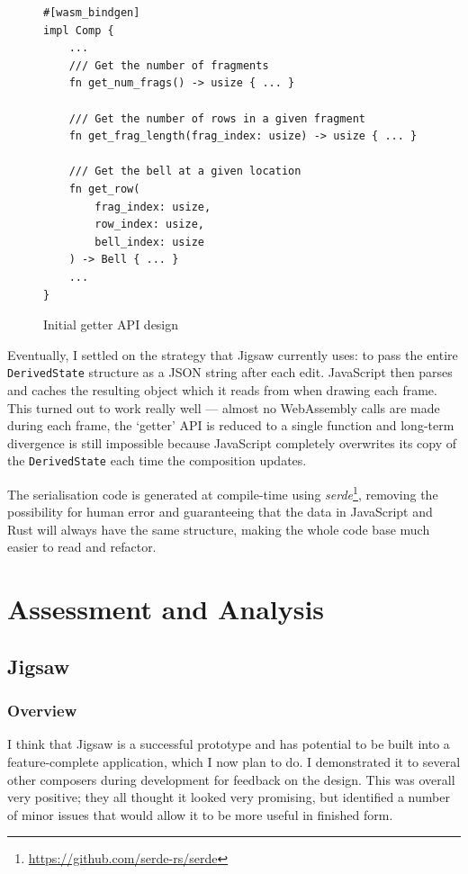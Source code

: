 \documentclass[12pt]{article}
\newcommand{\footurl}[1]{\footnote{\url{#1}}}
\begin{document}
\begin{figure}
    \begin{verbatim}
#[wasm_bindgen]
impl Comp {
    ...
    /// Get the number of fragments
    fn get_num_frags() -> usize { ... }

    /// Get the number of rows in a given fragment
    fn get_frag_length(frag_index: usize) -> usize { ... }

    /// Get the bell at a given location
    fn get_row(
        frag_index: usize,
        row_index: usize,
        bell_index: usize
    ) -> Bell { ... }
    ...
}
    \end{verbatim}
    \caption{Initial getter API design}\label{fig:initial-api}
\end{figure}

Eventually, I settled on the strategy that Jigsaw currently uses:  to pass the entire
\verb|DerivedState| structure as a JSON string after each edit.  JavaScript then parses and caches
the resulting object which it reads from when drawing each frame.  This turned out to work really
well --- almost no WebAssembly calls are made during each frame, the `getter' API is reduced to a
single function and long-term divergence is still impossible because JavaScript completely
overwrites its copy of the \verb|DerivedState| each time the composition updates.

The serialisation code is generated at compile-time using
\emph{serde}\footurl{https://github.com/serde-rs/serde}, removing the possibility for human error
and guaranteeing that the data in JavaScript and Rust will always have the same structure, making the whole
code base much easier to read and refactor.



\pagebreak

\section{Assessment and Analysis}

\subsection{Jigsaw}

\subsubsection{Overview}

I think that Jigsaw is a successful prototype and has potential to be built into a  feature-complete
application, which I now plan to do. I demonstrated it to several other composers during development
for feedback on the design.  This was overall very positive; they all thought it looked very promising, but
identified a number of minor issues that would allow it to be more useful in finished form.
\end{document}
